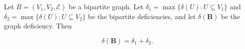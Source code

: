 Let $B = (V_1, V_2, \mathcal{E})$ be a bipartite graph. Let $\delta_1 = \max\{\delta(U) : U \subseteq V_1\}$ and $\delta_2 = \max\{\delta(U) : U \subseteq V_2\}$ be the bipartite deficiencies, and let $\delta(\mathbf{B})$ be the graph deficiency. Then

$$\delta(\mathbf{B}) = \delta_1 + \delta_2.$$
